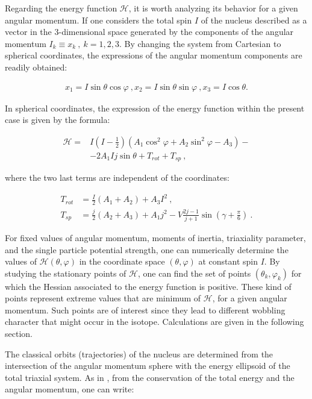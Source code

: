 \documentclass[%
 reprint,
 amsmath,
 amssymb,
 aps,
 floatfix,
]{revtex4-2}
\begin{document}
Regarding the energy function $\mathcal{H}$, it is worth analyzing its behavior for a given angular momentum. If one considers the total spin $I$ of the nucleus described as a vector in the 3-dimensional space generated by the components of the angular momentum $I_k\equiv x_k\ ,\ k=1,2,3$. By changing the system from Cartesian to spherical coordinates, the expressions of the angular momentum components are readily obtained:

\begin{align}
    x_1=I\sin\theta \cos\varphi\ ,
    x_2=I\sin\theta \sin\varphi\ ,
    x_3=I\cos\theta.
\end{align}

In spherical coordinates, the expression of the energy function within the present case is given by the formula:

\begin{align}
    \mathcal{H}=&I\left(I-\frac{1}{2}\right)\left(A_1\cos^2\varphi+A_2\sin^2\varphi-A_3\right)-\\
    &-2A_1Ij\sin\theta+T_{rot}+T_{sp}\ , \label{energy_function}
\end{align}

where the two last terms are independent of the coordinates:

\begin{align}
    T_{rot}&=\frac{I}{2}(A_1+A_2)+A_3I^2\ ,\\
    T_{sp}&=\frac{j}{2}(A_2+A_3)+A_1j^2-V\frac{2j-1}{j+1}\sin\left(\gamma+\frac{\pi}{6}\right)\ .
\end{align}

For fixed values of angular momentum, moments of inertia, triaxiality parameter, and the single particle potential strength, one can numerically determine the values of $\mathcal{H}(\theta,\varphi)$ in the coordinate space $(\theta,\varphi)$ at constant spin $I$. By studying the stationary points of $\mathcal{H}$, one can find the set of points $(\theta_k,\varphi_k)$ for which the Hessian associated to the energy function is positive. These kind of points represent extreme values that are minimum of $\mathcal{H}$, for a given angular momentum. Such points are of interest since they lead to different wobbling character that might occur in the isotope. Calculations are given in the following section.

The classical orbits (trajectories) of the nucleus are determined from the intersection of the angular momentum sphere with the energy ellipsoid of the total triaxial system. As in \cite{frauendorf2014transverse}, from the conservation of the total energy and the angular momentum, one can write:
\end{document}
